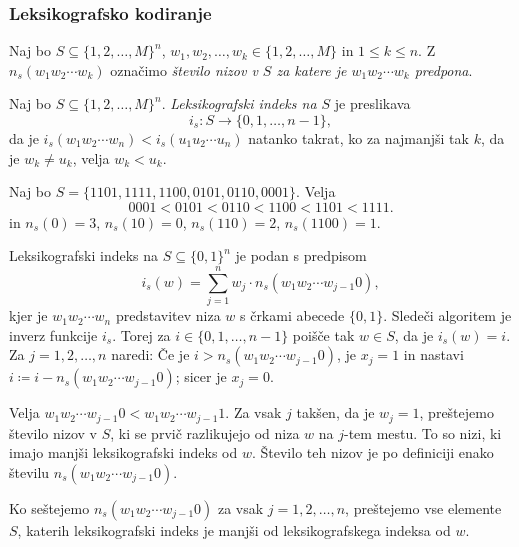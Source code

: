 \documentclass[fin1, tisk]{fmfdelo}
\theoremstyle{definition}
\begin{document}
\subsubsection{Leksikografsko kodiranje}%

\begin{definicija}
    Naj bo $S \subseteq \{ 1,2, \ldots, M\}^n$, $w_1, w_2, \ldots, w_k \in \{ 1,2, \ldots, M\}$
    in $1 \leq k \leq n$. Z $n_s(w_1w_2 \cdots w_k)$ označimo 
    \emph{število nizov v $S$ za katere je $w_1w_2 \cdots w_k$ predpona}.
\end{definicija}

\begin{definicija}
    Naj bo $S \subseteq \{ 1,2, \ldots, M\}^n$. \emph{Leksikografski indeks na $S$} je
    preslikava
    \[
        i_s \colon S \to \{ 0,1, \ldots, n -1 \},
    \]
    da je $i_s(w_1w_2 \cdots w_n) < i_s(u_1u_2 \cdots u_n)$ natanko takrat, ko za najmanjši
    tak $k$, da je $w_k \neq u_k$, velja $w_k < u_k$.
\end{definicija}

\begin{primer}\label{primer:številčenje}
    Naj bo $S = \{ 1101, 1111, 1100, 0101, 0110, 0001 \}$. Velja
    \[
        0001 < 0101 < 0110 < 1100 < 1101 < 1111.
    \]
    in $n_s(0) = 3$, $n_s(10) = 0$, $n_s(110) = 2$, $n_s(1100) = 1$.
\end{primer}

\begin{trditev}
    Leksikografski indeks na $S \subseteq \{ 0,1 \}^n$ je podan s predpisom
    \[
        i_s(w) = \sum_{j=1}^{n} w_j \cdot n_s(w_1w_2 \cdots w_{j-1}0),
    \]
    kjer je $w_1w_2 \cdots w_n$ predstavitev niza $w$ s črkami abecede $\{ 0,1 \}$.
    Sledeči algoritem je inverz funkcije $i_s$. Torej za $i \in \{ 0, 1, \ldots, n - 1 \}$ 
    poišče tak $w \in S$, da je $i_s(w) = i$. Za $j = 1, 2, \ldots, n$ naredi: Če je 
    $i > n_s(w_1w_2 \cdots w_{j-1}0)$, je $x_j = 1$ in nastavi 
    $i \coloneq  i - n_s(w_1w_2 \cdots w_{j-1}0)$; sicer je $x_j = 0$.
\end{trditev}

\begin{dokaz}
    Velja $w_1w_2 \cdots w_{j-1}0 < w_1w_2 \cdots w_{j-1}1$. Za vsak $j$ takšen, da je $w_j=1$,
    preštejemo število nizov v $S$, ki se prvič razlikujejo od niza $w$ na $j$-tem mestu.
    To so nizi, ki imajo manjši leksikografski indeks od $w$. Število teh nizov je po 
    definiciji enako številu $n_s(w_1w_2 \cdots w_{j-1}0)$.

    Ko seštejemo $n_s(w_1w_2 \cdots w_{j-1}0)$ za vsak $j = 1,2, \ldots, n$, preštejemo vse
    elemente $S$, katerih leksikografski indeks je manjši od leksikografskega indeksa od $w$.
\end{dokaz}
\end{document}
